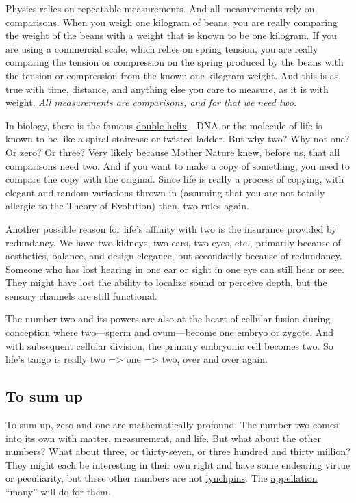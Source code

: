 \documentclass[
  a4paper,
]{article}
\begin{document}
Physics relies on repeatable measurements. And all measurements rely on
comparisons. When you weigh one kilogram of beans, you are really
comparing the weight of the beans with a weight that is known to be one
kilogram. If you are using a commercial scale, which relies on spring
tension, you are really comparing the tension or compression on the
spring produced by the beans with the tension or compression from the
known one kilogram weight. And this is as true with time, distance, and
anything else you care to measure, as it is with weight. \emph{All
measurements are comparisons, and for that we need two}.

In biology, there is the famous
\href{https://www.genome.gov/genetics-glossary/Double-Helix}{double
helix}---DNA or the molecule of life is known to be like a spiral
staircase or twisted ladder. But why two? Why not one? Or zero? Or
three? Very likely because Mother Nature knew, before us, that all
comparisons need two. And if you want to make a copy of something, you
need to compare the copy with the original. Since life is really a
process of copying, with elegant and random variations thrown in
(assuming that you are not totally allergic to the Theory of Evolution)
then, two rules again.

Another possible reason for life's affinity with two is the insurance
provided by redundancy. We have two kidneys, two ears, two eyes, etc.,
primarily because of aesthetics, balance, and design elegance, but
secondarily because of redundancy. Someone who has lost hearing in one
ear or sight in one eye can still hear or see. They might have lost the
ability to localize sound or perceive depth, but the sensory channels
are still functional.

The number two and its powers are also at the heart of cellular fusion
during conception where two---sperm and ovum---become one embryo or
zygote. And with subsequent cellular division, the primary embryonic
cell becomes two. So life's tango is really two =\textgreater{} one
=\textgreater{} two, over and over again.

\hypertarget{to-sum-up}{%
\subsection{To sum up}\label{to-sum-up}}

To sum up, zero and one are mathematically profound. The number two
comes into its own with matter, measurement, and life. But what about
the other numbers? What about three, or thirty-seven, or three hundred
and thirty million? They might each be interesting in their own right
and have some endearing virtue or peculiarity, but these other numbers
are not \href{https://www.thefreedictionary.com/lynchpin}{lynchpins}.
The \href{https://www.dictionary.com/browse/appellation}{appellation}
``many'' will do for them.
\end{document}
